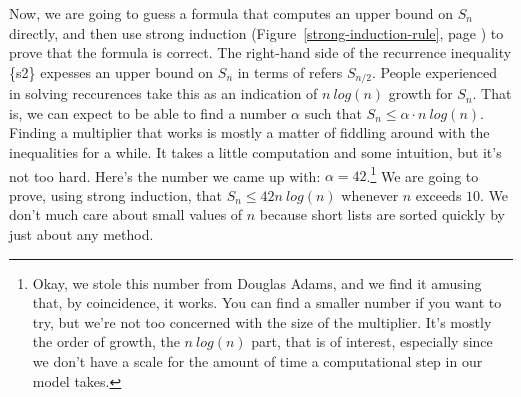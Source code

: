 Now, we are going to guess a formula that computes an upper bound on $S_n$ directly,
and then use strong induction
(Figure~\ref{strong-induction-rule}, page \pageref{strong-induction-rule})
to prove that the formula is correct.
The right-hand side of the recurrence inequality \{s2\} expesses
an upper bound on $S_n$ in terms of refers $S_{n/2}$.
People experienced in solving reccurences take this as an
indication of $n~log(n)$ growth for $S_n$.
That is, we can expect to be able to find a number $\alpha$ such that
$S_n \leq \alpha \cdot n~log(n)$.
Finding a multiplier that works is mostly a matter of
fiddling around with the inequalities for a while.
It takes a little computation and some intuition, but it's not too hard.
Here's the number we came up with: $\alpha = 42$.\footnote{Okay, we stole this
number from Douglas Adams, and we find it amusing that, by coincidence, it works.
You can find a smaller number if you want to try, but
we're not too concerned with the size of the multiplier.
It's mostly the order of growth, the $n~log(n)$ part, that is of interest,
especially since we don't have a scale for the amount of time a computational
step in our model takes.} We are going to prove, using strong induction,
that $S_n \leq 42 n~log(n)$ whenever $n$ exceeds $10$.
We don't much care about small values of $n$ because short lists
are sorted quickly by just about any method.

